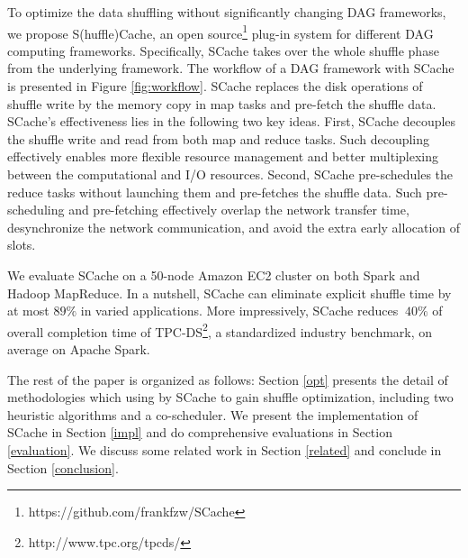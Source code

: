 {\color{black}
To optimize the data shuffling without significantly changing DAG frameworks, we propose S(huffle)Cache, an open source\footnote{https://github.com/frankfzw/SCache} plug-in system for different DAG computing frameworks.
Specifically, SCache takes over the whole shuffle phase from the underlying framework.
The workflow of a DAG framework with SCache is presented in Figure \ref{fig:workflow}. 
SCache replaces the disk operations of shuffle write by the memory copy in map tasks and pre-fetch the shuffle data.
SCache's effectiveness lies in the following two key ideas.
First, SCache decouples the shuffle write and read from both map and reduce tasks.
Such decoupling effectively enables more flexible resource management and better multiplexing between the computational and I/O resources.
Second, SCache pre-schedules the reduce tasks without launching them and pre-fetches the shuffle data. 
Such pre-scheduling and pre-fetching effectively overlap the network transfer time, desynchronize the network communication, 
and avoid the extra early allocation of slots.

We evaluate SCache on a 50-node Amazon EC2 cluster on both Spark and Hadoop MapReduce.
In a nutshell, SCache can eliminate explicit shuffle time by at most $89\%$ in varied applications. More impressively, SCache reduces $~40\%$ of overall completion time of TPC-DS\footnote{http://www.tpc.org/tpcds/}, a standardized industry benchmark, on average on Apache Spark.

The rest of the paper is organized as follows:
Section \ref{opt} presents the detail of methodologies which using by SCache to gain shuffle optimization, including two heuristic algorithms and a co-scheduler.
We present the implementation of SCache in Section \ref{impl} and do comprehensive evaluations in Section \ref{evaluation}.
We discuss some related work in Section \ref{related} and conclude in Section \ref{conclusion}.
}


